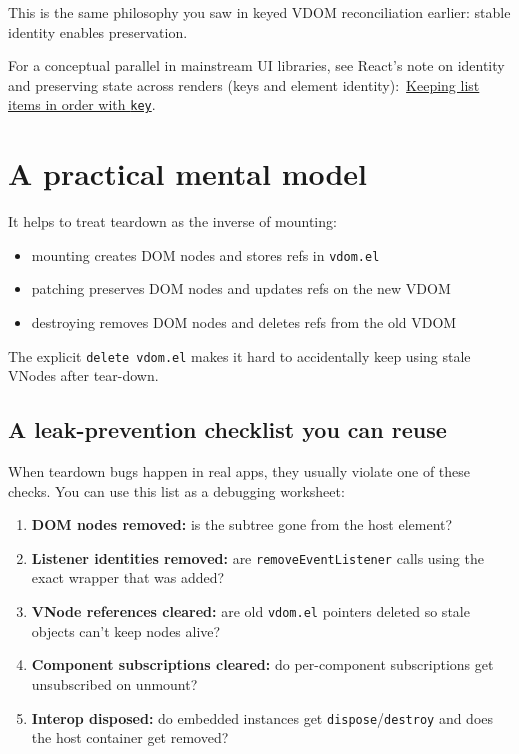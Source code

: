 This is the same philosophy you saw in keyed VDOM reconciliation earlier: stable identity enables preservation.

For a conceptual parallel in mainstream UI libraries, see React's note on identity and preserving state across renders (keys and element identity):\
\href{https://react.dev/learn/rendering-lists#keeping-list-items-in-order-with-key}{Keeping list items in order with \texttt{key}}.

\section{A practical mental model}

It helps to treat teardown as the inverse of mounting:

\begin{itemize}
  \item mounting creates DOM nodes and stores refs in \texttt{vdom.el}
  \item patching preserves DOM nodes and updates refs on the new VDOM
  \item destroying removes DOM nodes and deletes refs from the old VDOM
\end{itemize}

The explicit \texttt{delete vdom.el} makes it hard to accidentally keep using stale VNodes after tear-down.

\subsection{A leak-prevention checklist you can reuse}

When teardown bugs happen in real apps, they usually violate one of these checks.
You can use this list as a debugging worksheet:

\begin{enumerate}
  \item \textbf{DOM nodes removed:} is the subtree gone from the host element?
  \item \textbf{Listener identities removed:} are \texttt{removeEventListener} calls using the exact wrapper that was added?
  \item \textbf{VNode references cleared:} are old \texttt{vdom.el} pointers deleted so stale objects can't keep nodes alive?
  \item \textbf{Component subscriptions cleared:} do per-component subscriptions get unsubscribed on unmount?
  \item \textbf{Interop disposed:} do embedded instances get \texttt{dispose}/\texttt{destroy} and does the host container get removed?
\end{enumerate}

